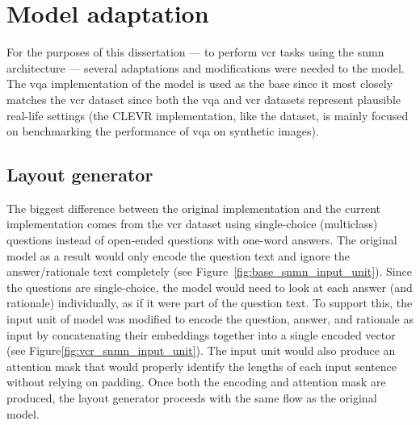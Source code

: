 \section{Model adaptation}
\label{sec:model_adaptation}

For the purposes of this dissertation --- to perform \gls{vcr} tasks using the \gls{snmn} architecture --- several adaptations and modifications were needed to the model.
The \gls{vqa} implementation of the model is used as the base since it most closely matches the \gls{vcr} dataset since both the \gls{vqa} and \gls{vcr} datasets represent plausible real-life settings (the CLEVR implementation, like the dataset, is mainly focused on benchmarking the performance of \gls{vqa} on synthetic images).

\subsection{Layout generator}
\label{subsec:layout_generator}

The biggest difference between the original implementation and the current implementation comes from the \gls{vcr} dataset using single-choice (multiclass) questions instead of open-ended questions with one-word answers.
The original model as a result would only encode the question text and ignore the answer/rationale text completely (see Figure~\ref{fig:base_snmn_input_unit}).
Since the questions are single-choice, the model would need to look at each answer (and rationale) individually, as if it were part of the question text.
To support this, the input unit of model was modified to encode the question, answer, and rationale as input by concatenating their embeddings together into a single encoded vector (see Figure\ref{fig:vcr_snmn_input_unit}).
The input unit would also produce an attention mask that would properly identify the lengths of each input sentence without relying on padding.
Once both the encoding and attention mask are produced, the layout generator proceeds with the same flow as the original model.

